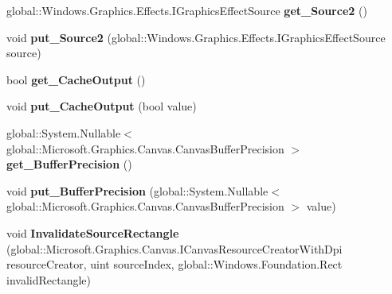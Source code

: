 \begin{DoxyCompactItemize}
global\+::\+Windows.\+Graphics.\+Effects.\+I\+Graphics\+Effect\+Source {\bfseries get\+\_\+\+Source2} ()
\item 
\mbox{\label{class_microsoft_1_1_graphics_1_1_canvas_1_1_effects_1_1_arithmetic_composite_effect_a6fc942115753422f521d5e898ca31269}} 
void {\bfseries put\+\_\+\+Source2} (global\+::\+Windows.\+Graphics.\+Effects.\+I\+Graphics\+Effect\+Source source)
\item 
\mbox{\label{class_microsoft_1_1_graphics_1_1_canvas_1_1_effects_1_1_arithmetic_composite_effect_a4a8faa27b7f40cff2b8a4d59917a7fa6}} 
bool {\bfseries get\+\_\+\+Cache\+Output} ()
\item 
\mbox{\label{class_microsoft_1_1_graphics_1_1_canvas_1_1_effects_1_1_arithmetic_composite_effect_a41c8211f5c32f5e32af7fab7c98f6225}} 
void {\bfseries put\+\_\+\+Cache\+Output} (bool value)
\item 
\mbox{\label{class_microsoft_1_1_graphics_1_1_canvas_1_1_effects_1_1_arithmetic_composite_effect_a236603da73776f77972d52e595c0626f}} 
global\+::\+System.\+Nullable$<$ global\+::\+Microsoft.\+Graphics.\+Canvas.\+Canvas\+Buffer\+Precision $>$ {\bfseries get\+\_\+\+Buffer\+Precision} ()
\item 
\mbox{\label{class_microsoft_1_1_graphics_1_1_canvas_1_1_effects_1_1_arithmetic_composite_effect_aca2fb121403654ced1e4c0a762df80b6}} 
void {\bfseries put\+\_\+\+Buffer\+Precision} (global\+::\+System.\+Nullable$<$ global\+::\+Microsoft.\+Graphics.\+Canvas.\+Canvas\+Buffer\+Precision $>$ value)
\item 
\mbox{\label{class_microsoft_1_1_graphics_1_1_canvas_1_1_effects_1_1_arithmetic_composite_effect_a2e5a1ad13049cf4c774db94dcd6bc8d4}} 
void {\bfseries Invalidate\+Source\+Rectangle} (global\+::\+Microsoft.\+Graphics.\+Canvas.\+I\+Canvas\+Resource\+Creator\+With\+Dpi resource\+Creator, uint source\+Index, global\+::\+Windows.\+Foundation.\+Rect invalid\+Rectangle)

\end{DoxyCompactItemize}
